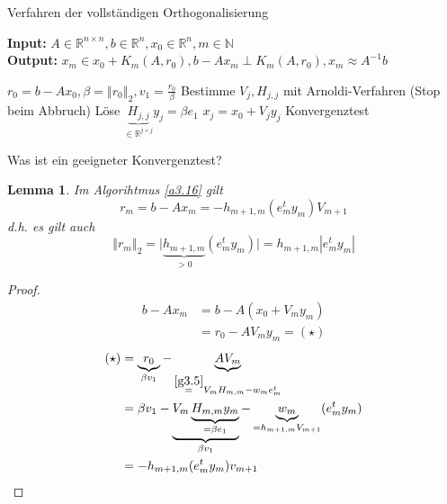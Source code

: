 \documentclass{book}
\newtheorem{lemma}[algorithm]{Lemma}
\def\R{\mathbb{R}}
\def\N{\mathbb{N}}
\begin{document}
            \begin{algorithm}[H]
                \caption{Verfahren der vollständigen Orthogonalisierung}\label{a3.16}
                \textbf{Input:} $A\in\R^{n\times n},b\in\R^n,x_0\in\R^n,m\in\N$\\
                \textbf{Output:} $x_m\in x_0+K_m(A,r_0),b-Ax_m\perp K_m(A,r_0), x_m\approx A^{-1}b$
                \begin{algorithmic}
                \State $r_0=b-Ax_0,\beta=\left\Vert r_0 \right\Vert_2,v_1=\frac{r_0}{\beta}$
                    \State Bestimme $V_j, H_{j,j}$ mit Arnoldi-Verfahren (Stop beim Abbruch)
                    \State Löse $\underbrace{H_{j,j}}_{\in\R^{j\times j}}y_j = \beta e_1$
                    \State $x_j=x_0+V_jy_j$
                    \State Konvergenztest
                \EndFor
                \end{algorithmic}
            \end{algorithm}

            Was ist ein geeigneter Konvergenztest?

            \begin{lemma}\label{l3.17}
                Im Algorihtmus \ref{a3.16} gilt 
                \[r_m=b-Ax_m=-h_{m+1,m}(e_m^ty_m)V_{m+1}\]
                d.h. es gilt auch 
                \[
                    \left\Vert r_m \right\Vert_2 = \vert \underbrace{h_{m+1,m}}_{>0} (e^t_m y_m)\vert = h_{m+1,m} \left\vert e_m^ty_m \right\vert    
                \]
            \end{lemma}

            \begin{proof}
                \begin{align*}
                    b-Ax_m&=b-A(x_0+V_my_m)\\
                    &= r_0-  AV_my_m = (\star)
                \end{align*}
                \begin{align*}
                    (\star)&= \underbrace{r_0}_{\beta v_1}-\underbrace{AV_m}_{\stackrel{\ref{g3.5}}{=}V_mH_{m,m}-w_me_m^t}\\
                     &= \beta v_1 - \underbrace{V_m\underbrace{H_{m,m}y_m}_{=\beta e_1}}_{\beta v_1}- \underbrace{w_m}_{=h_{m+1,m}V_{m+1}}(e_m^ty_m)\\
                     &= -h_{m+1,m}(e_m^ty_m)v_{m+1}
                \end{align*}
            \end{proof}
\end{document}
